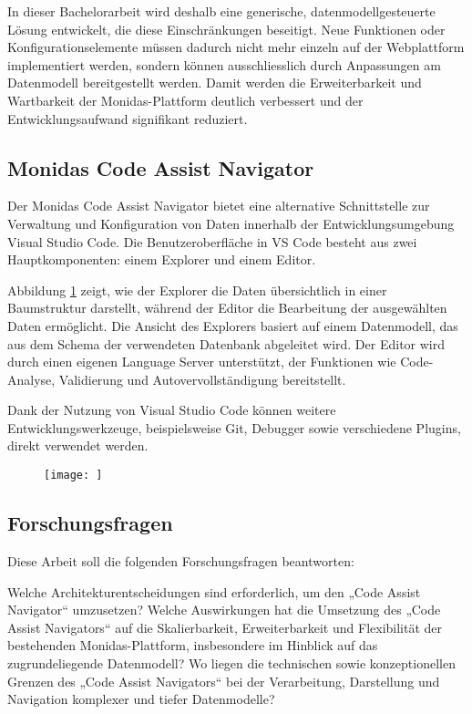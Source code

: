 In dieser Bachelorarbeit wird deshalb eine generische, datenmodellgesteuerte Lösung entwickelt, die diese Einschränkungen beseitigt. Neue Funktionen oder Konfigurationselemente müssen dadurch nicht mehr einzeln auf der Webplattform implementiert werden, sondern können ausschliesslich durch Anpassungen am Datenmodell bereitgestellt werden. Damit werden die Erweiterbarkeit und Wartbarkeit der Monidas-Plattform deutlich verbessert und der Entwicklungsaufwand signifikant reduziert.

\newpage
\subsection{Monidas Code Assist Navigator}
Der Monidas Code Assist Navigator bietet eine alternative Schnittstelle zur Verwaltung und Konfiguration von Daten innerhalb der Entwicklungsumgebung Visual Studio Code. Die Benutzeroberfläche in VS Code besteht aus zwei Hauptkomponenten: einem Explorer und einem Editor.

Abbildung \ref{fig:res} zeigt, wie der Explorer die Daten übersichtlich in einer Baumstruktur darstellt, während der Editor die Bearbeitung der ausgewählten Daten ermöglicht. Die Ansicht des Explorers basiert auf einem Datenmodell, das aus dem Schema der verwendeten Datenbank abgeleitet wird. Der Editor wird durch einen eigenen Language Server unterstützt, der Funktionen wie Code-Analyse, Validierung und Autovervollständigung bereitstellt.

Dank der Nutzung von Visual Studio Code können weitere Entwicklungswerkzeuge, beispielsweise Git, Debugger sowie verschiedene Plugins, direkt verwendet werden.


\begin{figure}[H]
  \centering
  \texttt{[image: ]}
  \caption{}
  \label{fig:res}
\end{figure}

\newpage

\subsection{Forschungsfragen}

Diese Arbeit soll die folgenden Forschungsfragen beantworten:

Welche Architekturentscheidungen sind erforderlich, um den „Code Assist Navigator“ umzusetzen? Welche Auswirkungen hat die Umsetzung des „Code Assist Navigators“ auf die Skalierbarkeit, Erweiterbarkeit und Flexibilität der bestehenden Monidas-Plattform, insbesondere im Hinblick auf das zugrundeliegende Datenmodell? Wo liegen die technischen sowie konzeptionellen Grenzen des „Code Assist Navigators“ bei der Verarbeitung, Darstellung und Navigation komplexer und tiefer Datenmodelle?

